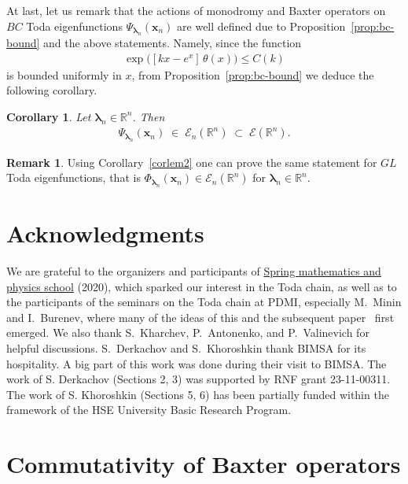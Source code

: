 \documentclass[11pt]{article}
\numberwithin{equation}{section}
\theoremstyle{plain}
\newtheorem{corollary}{Corollary}
\theoremstyle{definition}
\newtheorem{remark}{Remark}
\begin{document}
At last, let us remark that the actions of monodromy and Baxter operators on $BC$ Toda eigenfunctions $\Psi_{\bm{\lambda}_n}(\bm{x}_n)$ are well defined due to Proposition~\ref{prop:bc-bound} and the above statements. Namely, since the function
\begin{align}
	\exp \bigl([k x - e^{x}] \, \theta(x) \bigr) \leq C(k)
\end{align}
is bounded uniformly in $x$, from Proposition~\ref{prop:bc-bound} we deduce the following corollary.
\begin{corollary} \label{cor:Psi-E}
	Let $\bm{\lambda}_n \in \mathbb{R}^n$. Then 
	\begin{align}
		\Psi_{\bm{\lambda}_n}(\bm{x}_n) \; \in \; \mathcal{E}_n(\mathbb{R}^n)  \; \subset \; \mathcal{E}(\mathbb{R}^n).
	\end{align}
\end{corollary}

\begin{remark}
	Using Corollary~\ref{corlem2} one can prove the same statement for $GL$ Toda eigenfunctions, that is $\Phi_{\bm{\lambda}_n}(\bm{x}_n) \in \mathcal{E}_n(\mathbb{R}^n)$ for $\bm{\lambda}_n \in \mathbb{R}^n$.
\end{remark}


\section*{Acknowledgments}
We are grateful to the organizers and participants of \href{https://mathphysschool.github.io/2020/}{Spring mathematics and physics school} (2020), which sparked our interest in the Toda chain, as well as to the participants of the seminars on the Toda chain at PDMI, especially M.~Minin and I.~Burenev, where many of the ideas of this and the subsequent paper~\cite{BDK} first emerged. We also thank S.~Kharchev, P.~Antonenko, and P.~Valinevich for helpful discussions. S.~Derkachov and S.~Khoroshkin thank BIMSA for its hospitality. A big part of this work was done during their visit to BIMSA. The work of S. Derkachov (Sections 2, 3) was supported by RNF grant 23-11-00311.
The work of S. Khoroshkin (Sections 5, 6) has been partially funded within the framework of the HSE University Basic Research Program. 

\appendix

\section{Commutativity of Baxter operators} \label{sec:YB-refl-op}
\end{document}
